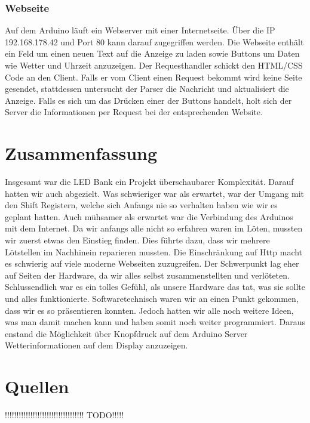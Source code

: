 \documentclass[10pt,a4paper]{article}
\begin{document}
\subsubsection{Webseite}

Auf dem Arduino läuft ein Webserver mit einer Internetseite. Über die IP 192.168.178.42 und Port 80 kann darauf zugegriffen werden. Die Webseite enthält ein Feld um einen neuen Text auf die Anzeige zu laden sowie Buttons um Daten wie Wetter und Uhrzeit anzuzeigen. Der Requesthandler schickt den HTML/CSS Code an den Client. Falls er vom Client einen Request bekommt wird keine Seite gesendet, stattdessen untersucht der Parser die Nachricht und aktualisiert die Anzeige. Falls es sich um das Drücken einer der Buttons handelt, holt sich der Server die Informationen per Request bei der entsprechenden Website. \\

\section{Zusammenfassung}

Insgesamt war die LED Bank ein Projekt überschaubarer Komplexität. Darauf hatten wir auch abgezielt. Was schwieriger war als erwartet, war der Umgang mit den Shift Registern, welche sich Anfangs nie so verhalten haben wie wir es geplant hatten. Auch mühsamer als erwartet war die Verbindung des Arduinos mit dem Internet. Da wir anfangs alle nicht so erfahren waren im Löten, mussten wir zuerst etwas den Einstieg finden. Dies führte dazu, dass wir mehrere Lötstellen im Nachhinein reparieren mussten. Die Einschränkung auf Http macht es schwierig auf viele moderne Webseiten zuzugreifen.  Der Schwerpunkt lag eher auf Seiten der Hardware, da wir alles selbst zusammenstellten und verlöteten. Schlussendlich war es ein tolles Gefühl, als unsere Hardware das tat, was sie sollte und alles funktionierte. Softwaretechnisch waren wir an einen Punkt gekommen, dass wir es so präsentieren konnten. Jedoch hatten wir alle noch weitere Ideen, was man damit machen kann und haben somit noch weiter programmiert. Daraus enstand die Möglichkeit über Knopfdruck auf dem Arduino Server Wetterinformationen auf dem Display anzuzeigen.

\section{Quellen}

!!!!!!!!!!!!!!!!!!!!!!!!!!!!!!!!!! TODO!!!!!\\
\end{document}
